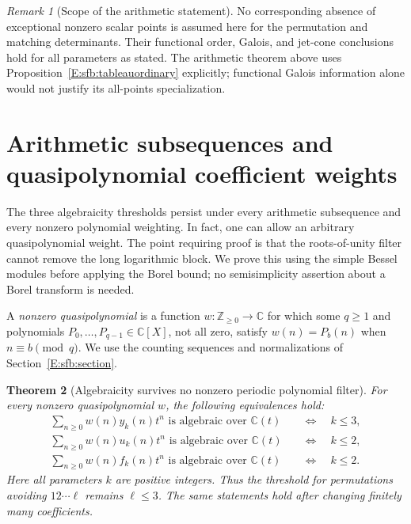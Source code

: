 \documentclass[11pt,a4paper]{article}
\newtheorem{theorem}{Theorem}[section]
\theoremstyle{definition}
\theoremstyle{remark}
\newtheorem{remark}[theorem]{Remark}
\numberwithin{equation}{section}
\begin{document}
\begin{remark}[Scope of the arithmetic statement]
No corresponding absence of exceptional nonzero scalar points
is assumed here for the permutation and matching determinants.
Their functional order, Galois, and jet-cone conclusions hold
for all parameters as stated.  The arithmetic theorem above
uses Proposition~\ref{E:sfb:tableauordinary} explicitly;
functional Galois information alone would not justify its
all-points specialization.
\end{remark}


\clearpage

\section{Arithmetic subsequences and quasipolynomial coefficient weights}
\label{E:qpa:section}

The three algebraicity thresholds persist under every arithmetic
subsequence and every nonzero polynomial weighting.  In fact, one can
allow an arbitrary quasipolynomial weight.  The point requiring proof is
that the roots-of-unity filter cannot remove the long logarithmic block.
We prove this using the simple Bessel modules before applying the Borel
bound; no semisimplicity assertion about a Borel transform is needed.

A \emph{nonzero quasipolynomial} is a function $w:\mathbb Z_{\ge0}\to
\mathbb C$ for which some $q\ge1$ and polynomials
$P_0,\ldots,P_{q-1}\in\mathbb C[X]$, not all zero, satisfy
$w(n)=P_b(n)$ when $n\equiv b\pmod q$.
We use the counting sequences and normalizations of
Section~\ref{E:sfb:section}.

\begin{theorem}[Algebraicity survives no nonzero periodic polynomial filter]
\label{E:qpa:classification}
For every nonzero quasipolynomial $w$, the following equivalences hold:
\begin{align*}
 \sum_{n\ge0}w(n)y_k(n)t^n\text{ is algebraic over }\mathbb C(t)
    &\quad\Longleftrightarrow\quad k\le3,\\
 \sum_{n\ge0}w(n)u_k(n)t^n\text{ is algebraic over }\mathbb C(t)
    &\quad\Longleftrightarrow\quad k\le2,\\
 \sum_{n\ge0}w(n)f_k(n)t^n\text{ is algebraic over }\mathbb C(t)
    &\quad\Longleftrightarrow\quad k\le2.
\end{align*}
Here all parameters $k$ are positive integers.  Thus the threshold for
permutations avoiding $12\cdots\ell$ remains $\ell\le3$.
The same statements hold after changing finitely many coefficients.
\end{theorem}
\end{document}
